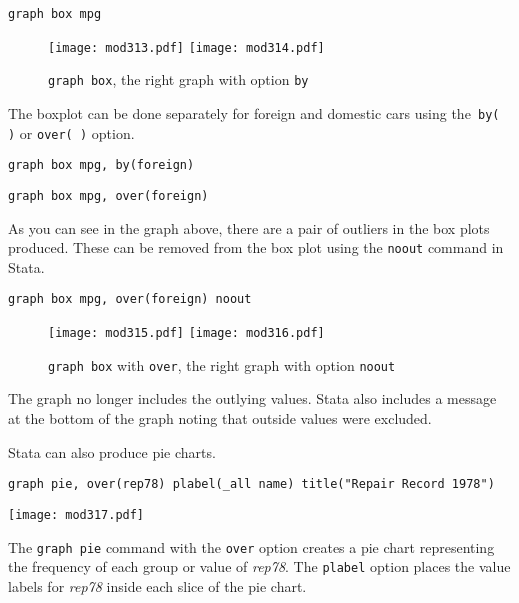 \begin{lstlisting}
graph box mpg
\end{lstlisting}

\begin{figure}[!htbp]
\centering
\texttt{[image: mod313.pdf]}
\texttt{[image: mod314.pdf]}
\caption{\lstinline{graph box}, the right graph with option \lstinline{by}\label{box}}
\end{figure}

The boxplot can be done separately for foreign and domestic cars using the\lstinline{ by( )} or \lstinline{over( )} option.

\begin{lstlisting}
graph box mpg, by(foreign)
\end{lstlisting}

\begin{lstlisting}
graph box mpg, over(foreign)
\end{lstlisting}

As you can see in the graph above, there are a pair of outliers in the box plots produced. These can be removed from the box plot using the \lstinline{noout} command in Stata.

\begin{lstlisting}
graph box mpg, over(foreign) noout
\end{lstlisting}

\begin{figure}[!htbp]
\centering
\texttt{[image: mod315.pdf]}
\texttt{[image: mod316.pdf]}
\caption{\lstinline{graph box} with \lstinline{over}, the right graph with option \lstinline{noout}\label{box2}}
\end{figure}

The graph no longer includes the outlying values. Stata also includes a message at the bottom of the graph noting that outside values were excluded.

Stata can also produce pie charts.

\begin{lstlisting}
graph pie, over(rep78) plabel(_all name) title("Repair Record 1978")
\end{lstlisting}

\begin{center}
\texttt{[image: mod317.pdf]}
\end{center}

The \lstinline{graph pie} command with the \lstinline{over} option creates a pie chart representing the frequency of each group or value of \textit{rep78}. The \lstinline{plabel} option places the value labels for \textit{rep78} inside each slice of the pie chart.

